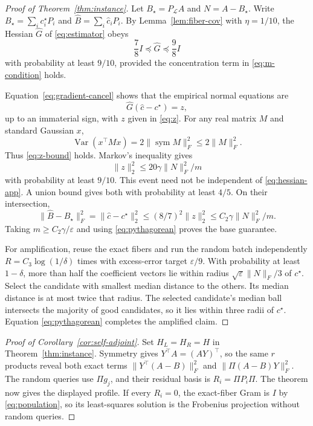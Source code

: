 \documentclass{article}
\theoremstyle{remark}
\newcommand{\cL}{\mathcal L}
\newcommand{\eps}{\varepsilon}
\newcommand{\sym}{\operatorname{sym}}
\newcommand{\1}{\mathbf 1}
\begin{document}
\begin{proof}[Proof of Theorem~\ref{thm:instance}]
Let $B_\star=P_\cL A$ and $N=A-B_\star$.  Write $B_\star=\sum_ic_i^\star P_i$ and $\widehat B=\sum_i\widehat c_iP_i$.  By Lemma~\ref{lem:fiber-cov} with $\eta=1/10$, the Hessian $\widehat G$ of \eqref{eq:estimator} obeys
\begin{equation}
 \frac78I\preceq\widehat G\preceq\frac98I
 \label{eq:hessian-app}
\end{equation}
with probability at least $9/10$, provided the concentration term in \eqref{eq:m-condition} holds.

Equation~\eqref{eq:gradient-cancel} shows that the empirical normal equations are \[ \widehat G(\widehat c-c^\star)=z, \] up to an immaterial sign, with $z$ given in \eqref{eq:z}.  For any real matrix $M$ and standard Gaussian $x$, \[ \operatorname{Var}(x^\top Mx) =2\|\sym M\|_F^2\le2\|M\|_F^2. \] Thus \eqref{eq:z-bound} holds.  Markov's inequality gives \[ \|z\|_2^2\le20\gamma\|N\|_F^2/m \] with probability at least $9/10$.  This event need not be independent of \eqref{eq:hessian-app}.  A union bound gives both with probability at least $4/5$.  On their intersection, \[ \|\widehat B-B_\star\|_F^2 =\|\widehat c-c^\star\|_2^2 \le(8/7)^2\|z\|_2^2 \le C_2\gamma\|N\|_F^2/m. \] Taking $m\ge C_2\gamma/\eps$ and using \eqref{eq:pythagorean} proves the base guarantee.

For amplification, reuse the exact fibers and run the random batch independently $R=C_3\log(1/\delta)$ times with excess-error target $\eps/9$.  With probability at least $1-\delta$, more than half the coefficient vectors lie within radius $\sqrt\eps\|N\|_F/3$ of $c^\star$.  Select the candidate with smallest median distance to the others.  Its median distance is at most twice that radius.  The selected candidate's median ball intersects the majority of good candidates, so it lies within three radii of $c^\star$.  Equation \eqref{eq:pythagorean} completes the amplified claim.
\end{proof}

\begin{proof}[Proof of Corollary~\ref{cor:self-adjoint}]
Set $H_L=H_R=H$ in Theorem~\ref{thm:instance}.  Symmetry gives $Y^\top A=(AY)^\top$, so the same $r$ products reveal both exact terms $\|Y^\top(A-B)\|_F^2$ and $\|\Pi(A-B)Y\|_F^2$.  The random queries use $\Pi g_j$, and their residual basis is $R_i=\Pi P_i\Pi$.  The theorem now gives the displayed profile.  If every $R_i=0$, the exact-fiber Gram is $I$ by \eqref{eq:population}, so its least-squares solution is the Frobenius projection without random queries.
\end{proof}
\end{document}
